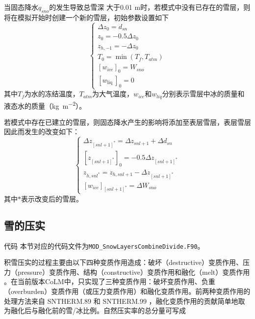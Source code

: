 当固态降水$q_{sno}$的发生导致总雪深 大于0.01 m时，若模式中没有已存在的雪层，则将在模拟开始时创建一个新的雪层，初始参数设置如下
\begin{equation}
\left\{\begin{array}{c}\Delta z_{0}={d}_{{sn}} \\ z_{0}=-0.5 \Delta z_{0} \\ z_{{h},-1}=-\Delta z_{0} \\ T_{0}=\min \left(T_{{f}}, T_{{atm}}\right) \\ {\left[{w}_{{ice}}\right]_{0}={W}_{{sno}}} \\ {\left[{w}_{\text {liq }}\right]_{0}=0}\end{array}\right.
\end{equation}
其中$T_f$为水的冻结温度，$T_{atm}$为大气温度，$w_{ice}$和$w_{liq}$分别表示雪层中冰的质量和液态水的质量（\unit{kg.m^{-2}}）。


若模式中存在已建立的雪层，则固态降水产生的影响将添加至表层雪层，表层雪层因此而发生的改变如下：
\begin{equation}
\left\{\begin{array}{c}\Delta z_{[{snl}+1]^{*}}=\Delta z_{{snl}+1}+\Delta {d}_{{sn}} \\ {\left[z_{[{snl}+1]^{*}}\right]_{0}=-0.5 \Delta z_{[{snl}+1]^{*}}} \\ z_{{h}, {snl}^{*}}=z_{{h}, {snl}+1}-\Delta z_{[{snl}+1]^{*}} \\ {\left[{w}_{{ice}}\right]_{[{snl}+1]^{*}}=\Delta {W}_{{sno}}}\end{array}\right.
\end{equation}
其中$\ast$表示改变后的雪层。


\subsection{雪的压实}
\begin{mymdframed}{代码}
本节对应的代码文件为\texttt{MOD\_SnowLayersCombineDivide.F90}。
\end{mymdframed}

积雪压实的过程主要由以下四种变质作用造成：破坏（destructive）变质作用、压力（pressure）变质作用、结构（constructive）变质作用和融化（melt）变质作用 \citep{yen1981review}。在当前版本CoLM中，只实现了三种变质作用：破坏变质作用、负重（overburden）变质作用（或压力变质作用）和融化变质作用。前两种变质作用的处理方法来自 SNTHERM.89 \citep{jordan1991one}和 SNTHERM.99 \citep{jordan1999heat}，融化变质作用的贡献简单地取为融化后与融化前的雪/冰比例。自然压实率的总分量可写成

